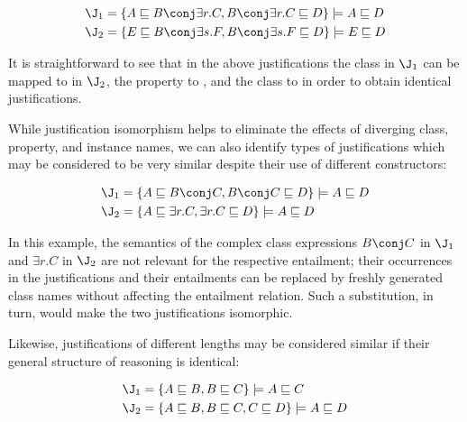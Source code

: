 \begin{examp}
\begin{align*}
\J_{1} &= \{ A \sqsubseteq B \conj \exists r.C, B \conj \exists r.C \sqsubseteq D\} \models A \sqsubseteq D\\
\J_{2} &= \{ E \sqsubseteq B \conj \exists s.F, B \conj \exists s.F  \sqsubseteq D\} \models E \sqsubseteq D
\end{align*}
\end{examp}

It is straightforward to see that in the above justifications the class  in $\J_{1}$ can be mapped to  in $\J_{2}$, the property  to , and the class  to  in order to obtain identical justifications.

While justification isomorphism helps to eliminate the effects of diverging class, property, and instance names, we can also identify types of justifications which may be considered to be very similar despite their use of different constructors:

\begin{examp}
\label{ex:subex}
\begin{align*}
\J_{1} &= \{A \sqsubseteq B \conj C, B \conj C \sqsubseteq D \} \models A \sqsubseteq D  \\ 
\J_{2} &= \{ A \sqsubseteq \exists r.C, \exists r.C  \sqsubseteq D\} \models A \sqsubseteq D
\end{align*}
\end{examp}
In this example, the semantics of the complex class expressions $B \conj C$ in $\J_{1}$ and $\exists r.C$ in $\J_{2}$  are not relevant for the respective entailment; their occurrences in the justifications and their entailments can be replaced by freshly generated class names without affecting the entailment relation. Such a substitution, in turn, would make the two justifications isomorphic.

Likewise, justifications of different lengths may be considered similar if their general structure of reasoning is identical:
\begin{examp}
\begin{align*}
\J_{1} &= \{A \sqsubseteq B, B \sqsubseteq C \} \models A \sqsubseteq C  \\ 
\J_{2} &= \{ A \sqsubseteq B, B \sqsubseteq C, C \sqsubseteq D \} \models A \sqsubseteq  D
\end{align*}
\end{examp}

